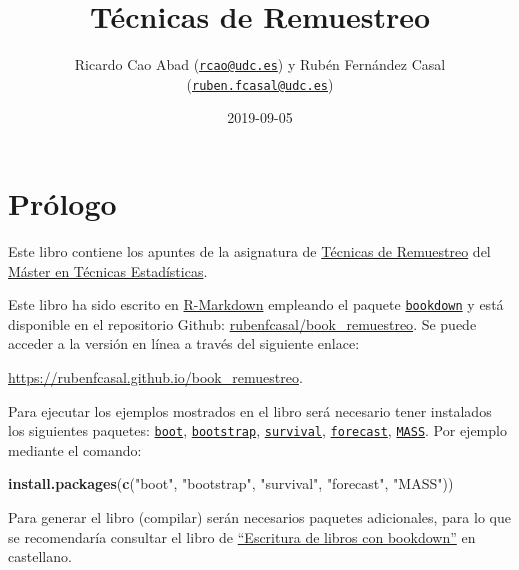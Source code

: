 \documentclass[]{book}
\title{Técnicas de Remuestreo}
\author{Ricardo Cao Abad (\href{mailto:rcao@udc.es}{\nolinkurl{rcao@udc.es}}) y
Rubén Fernández Casal
(\href{mailto:ruben.fcasal@udc.es}{\nolinkurl{ruben.fcasal@udc.es}})}
\date{2019-09-05}
\newenvironment{Shaded}{\begin{snugshade}}{\end{snugshade}}
\newcommand{\KeywordTok}[1]{\textcolor[rgb]{0.13,0.29,0.53}{\textbf{#1}}}
\newcommand{\StringTok}[1]{\textcolor[rgb]{0.31,0.60,0.02}{#1}}
\newcommand{\NormalTok}[1]{#1}
\theoremstyle{definition}
\theoremstyle{definition}
\theoremstyle{definition}
\theoremstyle{remark}
\begin{document}
\maketitle

{
\setcounter{tocdepth}{1}
\tableofcontents
}
\chapter*{Prólogo}\label{prologo}

Este libro contiene los apuntes de la asignatura de
\href{http://eamo.usc.es/pub/mte/index.php/es/?option=com_content\&view=article\&id=2202\&idm=22\&a\%C3\%B1o=2019}{Técnicas
de Remuestreo} del \href{http://eio.usc.es/pub/mte}{Máster en Técnicas
Estadísticas}.

Este libro ha sido escrito en
\href{http://rmarkdown.rstudio.com}{R-Markdown} empleando el paquete
\href{https://bookdown.org/yihui/bookdown/}{\texttt{bookdown}} y está
disponible en el repositorio Github:
\href{https://github.com/rubenfcasal/book_remuestreo}{rubenfcasal/book\_remuestreo}.
Se puede acceder a la versión en línea a través del siguiente enlace:

\url{https://rubenfcasal.github.io/book_remuestreo}.

Para ejecutar los ejemplos mostrados en el libro será necesario tener
instalados los siguientes paquetes:
\href{https://cran.r-project.org/web/packages/boot/index.html}{\texttt{boot}},
\href{https://cran.r-project.org/web/packages/bootstrap/index.html}{\texttt{bootstrap}},
\href{https://cran.r-project.org/web/packages/survival/index.html}{\texttt{survival}},
\href{https://cran.r-project.org/web/packages/forecast/index.html}{\texttt{forecast}},
\href{https://cran.r-project.org/web/packages/MASS/index.html}{\texttt{MASS}}.
Por ejemplo mediante el comando:

\begin{Shaded}
\begin{Highlighting}[]
\KeywordTok{install.packages}\NormalTok{(}\KeywordTok{c}\NormalTok{(}\StringTok{"boot"}\NormalTok{, }\StringTok{"bootstrap"}\NormalTok{, }\StringTok{"survival"}\NormalTok{, }\StringTok{"forecast"}\NormalTok{, }\StringTok{"MASS"}\NormalTok{))}
\end{Highlighting}
\end{Shaded}

Para generar el libro (compilar) serán necesarios paquetes adicionales,
para lo que se recomendaría consultar el libro de
\href{https://rubenfcasal.github.io/bookdown_intro}{``Escritura de
libros con bookdown''} en castellano.
\end{document}
